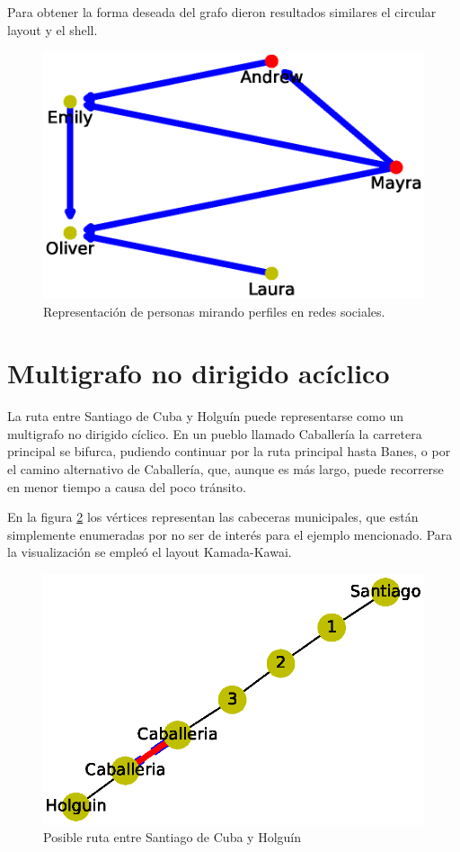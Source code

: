 \documentclass{article}
\begin{document}
Para obtener la forma deseada del grafo dieron resultados similares el circular layout y el shell.


\begin{figure}
\begin{center}
  \includegraphics[width=.6\columnwidth]{fig6.eps}
  \end{center}
  \caption{Representación de personas mirando perfiles en redes sociales.}
  \label{Figura 6}
\end{figure}




\section{Multigrafo no dirigido acíclico}

La ruta entre Santiago de Cuba y Holguín puede representarse  como un multigrafo no dirigido cíclico. En un pueblo llamado Caballería la carretera principal se bifurca, pudiendo continuar por la ruta principal hasta Banes, o por el camino alternativo de Caballería, que, aunque es más largo, puede recorrerse en menor tiempo a causa del poco tránsito.

En la figura \ref{Figura 7} los vértices representan las cabeceras municipales, que están simplemente enumeradas por no ser de interés para el ejemplo mencionado. Para la visualización se empleó el layout Kamada-Kawai.

\begin{figure}
  \includegraphics[width=.8\columnwidth]{fig7.eps}
  \caption{Posible ruta entre Santiago de Cuba y Holguín}
  \label{Figura 7}
\end{figure}
\end{document}
